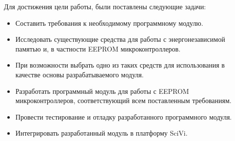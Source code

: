 Для достижения цели работы, были поставлены следующие задачи:
\begin{itemize}
	\item Составить требования к необходимому программному модулю. 
	\item Исследовать существующие средства для работы с энергонезависимой памятью и, в частности EEPROM микроконтроллеров. 
	\item При возможности выбрать одно из таких средств для использования в качестве основы разрабатываемого модуля.
	\item Разработать программный модуль для работы с EEPROM микроконтроллеров, соответствующий всем поставленным требованиям.
	\item Провести тестирование и отладку разработанного программного модуля.
	\item Интегрировать разработанный модуль в платформу SciVi.
\end{itemize}

